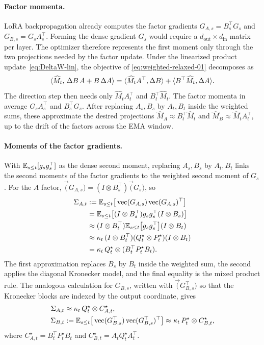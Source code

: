 \paragraph{Factor momenta.}
LoRA backpropagation already computes the factor gradients
$G_{A,s}=B_s^\top G_s$ and $G_{B,s}=G_sA_s^\top$. Forming the dense
gradient $G_s$ would require a $d_{\mathrm{out}}\times d_{\mathrm{in}}$
matrix per layer. The optimizer therefore represents the first moment only
through the two projections needed by the factor update. Under the
linearized product update~\eqref{eq:DeltaW-lin}, the objective of
\eqref{eq:weighted-relaxed-01} decomposes as
\[
  \langle \widehat M_t,\,\Delta B\,A+B\,\Delta A \rangle
  =
  \langle \widehat M_tA^\top,\Delta B \rangle
  +
  \langle B^\top\widehat M_t,\Delta A \rangle.
\]
The direction step then needs only $\widehat M_tA_t^\top$ and
$B_t^\top\widehat M_t$. The factor momenta in  average
$G_sA_s^\top$ and $B_s^\top G_s$. After replacing $A_s,B_s$ by
$A_t,B_t$ inside the weighted sums, these approximate the desired
projections $\widehat M_A\approx B_t^\top\widehat M_t$ and
$\widehat M_B\approx \widehat M_tA_t^\top$, up to the drift of the factors
across the EMA window.

\paragraph{Moments of the factor gradients.}
With $\mathbb{E}_{s\le t}[g_sg_s^\top]$ as the dense second moment, replacing
$A_s,B_s$ by $A_t,B_t$ links the second moments of the factor gradients to
the weighted second moment of $G_s$. For the $A$ factor,
$\vec(G_{A,s})=(I\otimes B_s^\top)\vec(G_s)$, so
\begin{align*}
 \Sigma_{A,t}
 &:= \mathbb{E}_{s\le t}\big[\operatorname{vec}(G_{A,s})\operatorname{vec}(G_{A,s})^\top\big] \\
 &= \mathbb{E}_{s\le t}\big[
      (I\otimes B_s^\top)g_sg_s^\top(I\otimes B_s)
    \big] \\
 &\approx
    (I\otimes B_t^\top)
    \mathbb{E}_{s\le t}\big[g_sg_s^\top\big]
    (I\otimes B_t) \\
 &\approx
    \kappa_t\,(I\otimes B_t^\top)
    (Q^\star_t\otimes P^\star_t)
    (I\otimes B_t) \\
 &= \kappa_t\,Q^\star_t\otimes(B_t^\top P^\star_tB_t).
\end{align*}
The first approximation replaces $B_s$ by $B_t$ inside the weighted
sum, the second applies the diagonal Kronecker model, and the final
equality is the mixed product rule. The analogous calculation for
$G_{B,s}$, written with $\vec(G_{B,s}^\top)$ so that the Kronecker
blocks are indexed by the output coordinate, gives
\begin{align}
  \Sigma_{A,t}
    &\approx \kappa_t\,Q^\star_t\otimes C^\star_{A,t},
  \nonumber \\
  \Sigma_{B,t}
    &:= \mathbb{E}_{s\le t}\big[
      \operatorname{vec}(G_{B,s}^\top)\operatorname{vec}(G_{B,s}^\top)^\top
    \big]
    \approx \kappa_t\,P^\star_t\otimes C^\star_{B,t},
  \label{eq:observable-moments-01}
\end{align}
where
$C^\star_{A,t}=B_t^\top P^\star_tB_t$ and
$C^\star_{B,t}=A_tQ^\star_tA_t^\top$.

